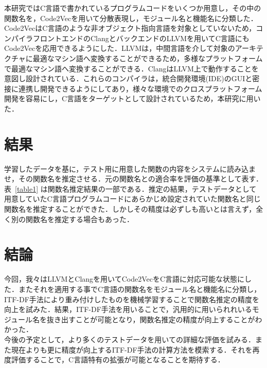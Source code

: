\documentclass[submit,techrep,noauthor]{ipsj}
\begin{document}
本研究ではC言語で書かれているプログラムコードをいくつか用意し，その中の関数名を，Code2Vecを用いて分散表現し，モジュール名と機能名に分類した．Code2VecはC言語のような非オブジェクト指向言語を対象としていないため，コンパイラフロントエンドのClangとバックエンドのLLVMを用いてC言語にもCode2Vecを応用できるようにした．LLVMは，中間言語を介して対象のアーキテクチャに最適なマシン語へ変換することができるため，多様なプラットフォームで最適なマシン語へ変換することができる．ClangはLLVM上で動作することを意図し設計されている．これらのコンパイラは，統合開発環境(IDE)のGUIと密接に連携し開発できるようにしてあり，様々な環境でのクロスプラットフォーム開発を容易にし，C言語をターゲットとして設計されているため，本研究に用いた．




\section{結果}
学習したデータを基に，テスト用に用意した関数の内容をシステムに読み込ませ，その関数名を推定させる．元の関数名との適合率を評価の基準として表す．
表~\ref{table1} は関数名推定結果の一部である．推定の結果，テストデータとして用意していたC言語プログラムコードにあらかじめ設定されていた関数名と同じ関数名を推定することができた．しかしその精度は必ずしも高いとは言えず，全く別の関数名を推定する場合もあった．

\section{結論}
今回，我々はLLVMとClangを用いてCode2VecをC言語に対応可能な状態にした．またそれを適用する事でC言語の関数名をモジュール名と機能名に分類し，ITF-DF手法により重み付けしたものを機械学習することで関数名推定の精度を向上を試みた．結果，ITF-DF手法を用いることで，汎用的に用いられれいるモジュール名を抜き出すことが可能となり，関数名推定の精度が向上することがわかった．\\
今後の予定として，より多くのテストデータを用いての詳細な評価を試みる．また現在よりも更に精度が向上するITF-DF手法の計算方法を模索する．それを再度評価することで，C言語特有の拡張が可能となることを期待する．




\end{document}
